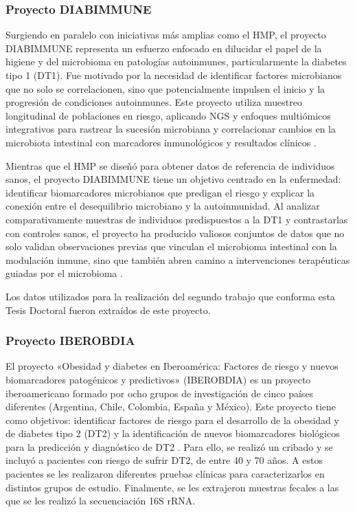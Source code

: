 \subsubsection{Proyecto DIABIMMUNE}

Surgiendo en paralelo con iniciativas más amplias como el HMP, el proyecto DIABIMMUNE representa un esfuerzo enfocado en dilucidar el papel de la higiene y del microbioma en patologías autoinmunes, particularmente la diabetes tipo 1 (DT1). Fue motivado por la necesidad de identificar factores microbianos que no solo se correlacionen, sino que potencialmente impulsen el inicio y la progresión de condiciones autoinmunes. Este proyecto utiliza muestreo longitudinal de poblaciones en riesgo, aplicando NGS y enfoques multiómicos integrativos para rastrear la sucesión microbiana y correlacionar cambios en la microbiota intestinal con marcadores inmunológicos y resultados clínicos \cite{DIABIMMUNE_project}.

Mientras que el HMP se diseñó para obtener datos de referencia de individuos sanos, el proyecto DIABIMMUNE tiene un objetivo centrado en la enfermedad: identificar biomarcadores microbianos que predigan el riesgo y explicar la conexión entre el desequilibrio microbiano y la autoinmunidad. Al analizar comparativamente muestras de individuos predispuestos a la DT1 y contrastarlas con controles sanos, el proyecto ha producido valiosos conjuntos de datos que no solo validan observaciones previas que vinculan el microbioma intestinal con la modulación inmune, sino que también abren camino a intervenciones terapéuticas guiadas por el microbioma \cite{kostic2015dynamics, mustonen2018early, miettinen2022breastfeeding}.

Los datos utilizados para la realización del segundo trabajo \cite{paper2} que conforma esta Tesis Doctoral fueron extraídos de este proyecto.


\subsubsection{Proyecto IBEROBDIA}

El proyecto «Obesidad y diabetes en Iberoamérica: Factores de riesgo y nuevos biomarcadores patogénicos y predictivos» (IBEROBDIA) es un proyecto iberoamericano formado por ocho grupos de investigación de cinco países diferentes (Argentina, Chile, Colombia, España y México). Este proyecto tiene como objetivos: identificar factores de riesgo para el desarrollo de la obesidad y de diabetes tipo 2 (DT2) y la identificación de nuevos biomarcadores biológicos para la predicción y diagnóstico de DT2 \cite{IBEROBDIA_project}. Para ello, se realizó un cribado y se incluyó a pacientes con riesgo de sufrir DT2, de entre 40 y 70 años. A estos pacientes se les realizaron diferentes pruebas clínicas para caracterizarlos en distintos grupos de estudio. Finalmente, se les extrajeron muestras fecales a las que se les realizó la secuenciación 16S rRNA.

